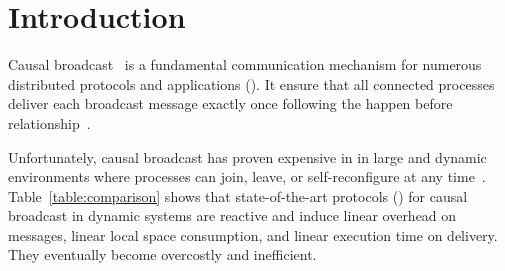 
\section{Introduction}


Causal broadcast~\cite{hadzilacos1994modular} is a fundamental communication
mechanism for numerous distributed protocols and applications (\REF).
It ensure that all connected processes deliver each broadcast message exactly
once following the happen before
relationship~\cite{lamport1978time,schwarz1994detecting}.


Unfortunately, causal broadcast has proven expensive in in large and dynamic
environments where processes can join, leave, or self-reconfigure at any
time~\cite{charronbost1991concerning}. Table~\ref{table:comparison} shows that
state-of-the-art protocols (\REF) for causal broadcast in dynamic systems are
reactive and induce linear overhead on messages, linear local space consumption,
and linear execution time on delivery. They eventually become overcostly and
inefficient.


